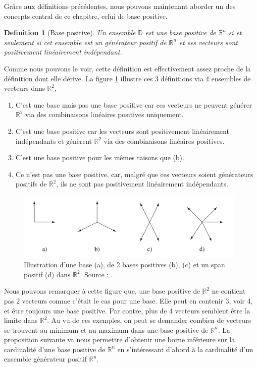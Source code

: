 \documentclass[french]{report}
\newtheorem{defn}{Definition}[section]
\newcommand{\definition}[2]{\begin{defn}[#1] #2 \end{defn}}
\begin{document}
Grâce aux définitions précédentes, nous pouvons maintenant aborder un des concepts central de ce chapitre, celui de base positive.

\definition{Base positive}
{
    Un ensemble $\mathbb{D}$ est une base positive de $\mathbb{R}^n$ si et seulement si cet ensemble est un générateur positif de $\mathbb{R}^n$ et ses vecteurs sont positivement linéairement indépendant.
}

Comme nous pouvons le voir, cette définition est effectivement assez proche de la définition dont elle dérive. La figure \ref{fig:bases,pspan, pLI} illustre ces 3 définitions via 4 ensembles de vecteurs dans $\mathbb{R}^2$,
\begin{enumerate}[label=(\alph*)]
    \item C'est une base mais pas une base positive car ces vecteurs ne peuvent générer $\mathbb{R}^2$ via des combinaisons linéaires positives uniquement.
    \item C'est une base positive car les vecteurs sont positivement linéairement indépendants et génèrent $\mathbb{R}^2$ via des combinaisons linéaires positives.
    \item C'est une base positive pour les mêmes raisons que (b).
    \item Ce n'est pas une base positive, car, malgré que ces vecteurs soient générateurs positifs de $\mathbb{R}^2$, ils ne sont pas positivement linéairement indépendants.
\end{enumerate}

\begin{figure}
    \centering
    \includegraphics[width = 14cm]{illustration_pspan_pbases.png}
    \caption{Illustration d'une base (a), de 2 bases positives (b), (c) et un span positif (d) dans $\mathbb{R}^2$. Source : \cite{AuHa2017a}.}
    \label{fig:bases,pspan, pLI}
\end{figure}

Nous pouvons remarquer à cette figure que, une base positive de $\mathbb{R}^2$ ne contient pas 2 vecteurs comme c'était le cas pour une base. Elle peut en contenir 3, voir 4, et être toujours une base positive. Par contre, plus de 4 vecteurs semblent être la limite dans $\mathbb{R}^2$.  Au vu de ces exemples, on peut se demander combien de vecteurs se trouvent au minimum et au maximum dans une base positive de $\mathbb{R}^n$.
La proposition suivante va nous permettre d'obtenir une borne inférieure sur la cardinalité d'une base positive de $\mathbb{R}^n$ en s'intéressant d'abord à la cardinalité d'un ensemble générateur positif $\mathbb{R}^n$.
\end{document}
